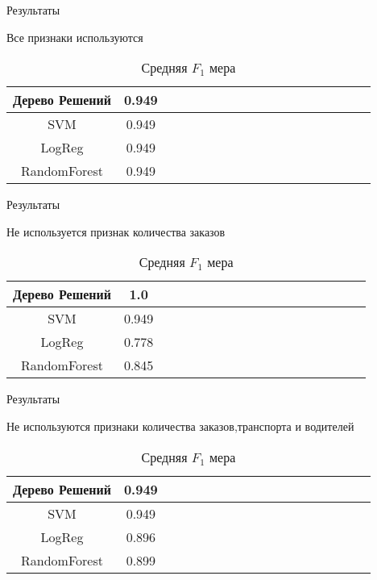 \documentclass{beamer}
\begin{document}
\begin{frame}{Результаты}
\begin{block}{Все признаки используются}
\begin{table}[!h]
	\centering
	\caption{Средняя $F_1$ мера}
	\label{my-label}
	\begin{tabular}{|*{18}{c|}}\hline
		Дерево Решений & 0.949\\\hline
		SVM &  0.949  \\\hline
		LogReg & 0.949  \\\hline
		RandomForest &0.949 \\\hline
	\end{tabular}
\end{table}
\end{block}
\end{frame}

\begin{frame}{Результаты}
\begin{block}{Не используется признак количества заказов}
	\begin{table}[!h]
		\centering
		\caption{Средняя $F_1$ мера}
		\label{my-label}
		\begin{tabular}{|*{18}{c|}}\hline
			Дерево Решений & 1.0\\\hline
			SVM &  0.949  \\\hline
			LogReg & 0.778  \\\hline
			RandomForest &0.845 \\\hline
		\end{tabular}
	\end{table}
\end{block}
\end{frame}

\begin{frame}{Результаты}
\begin{block}{Не используются признаки количества заказов,транспорта и водителей}
	\begin{table}[!h]
		\centering
		\caption{Средняя $F_1$ мера}
		\label{my-label}
		\begin{tabular}{|*{18}{c|}}\hline
			Дерево Решений & 0.949\\\hline
			SVM &  0.949  \\\hline
			LogReg & 0.896  \\\hline
			RandomForest &0.899 \\\hline
		\end{tabular}
	\end{table}
\end{block}
\end{frame}
\end{document}
